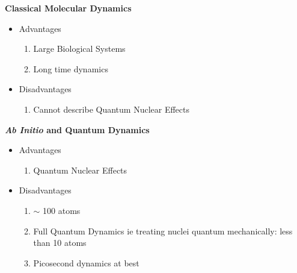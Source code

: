 \documentclass[slidestop,mathserif,compress,xcolor=svgnames]{beamer}
\newenvironment{eblock}[0]
{
\begin{beamerboxesrounded}[upper=uppercol2,lower=lowercol2,shadow=true]}
{\end{beamerboxesrounded}}
\begin{document}
\begin{frame}
  \begin{eblock}{\bf Classical Molecular Dynamics}
    \begin{itemize}
    \item Advantages
      \begin{enumerate}
      \item Large Biological Systems
      \item Long time dynamics
      \end{enumerate}
    \item Disadvantages
      \begin{enumerate}
      \item Cannot describe Quantum Nuclear Effects
      \end{enumerate}
    \end{itemize}
  \end{eblock}
  \begin{eblock}{\bf \textit{Ab Initio} and Quantum Dynamics}
    \begin{itemize}
    \item Advantages
      \begin{enumerate}
      \item Quantum Nuclear Effects
      \end{enumerate}
    \item Disadvantages
      \begin{enumerate}
      \item $\sim$ 100 atoms
      \item Full Quantum Dynamics ie treating nuclei quantum mechanically: less than 10 atoms
      \item Picosecond dynamics at best
      \end{enumerate}
      
    \end{itemize}
  \end{eblock}
\end{frame}
\end{document}
